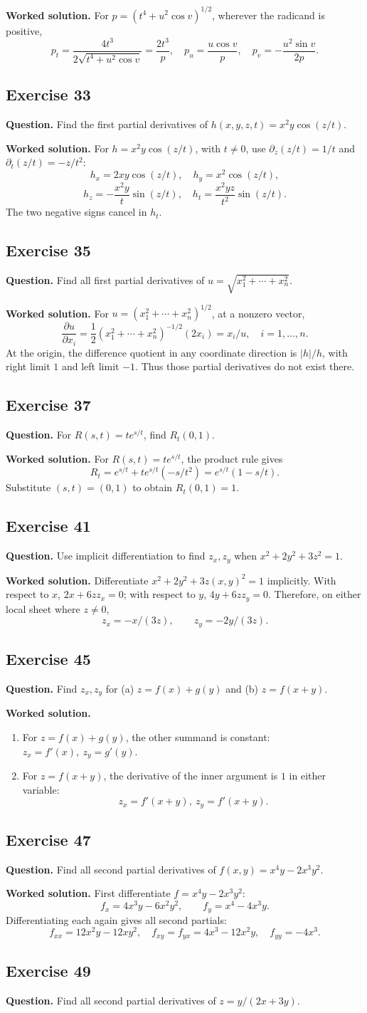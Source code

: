 \documentclass[11pt]{article}
\newcommand{\ex}[1]{\Needspace{8\baselineskip}\subsection*{Exercise #1}}
\newcommand{\ans}[1]{\boxed{#1}}
\begin{document}
\textbf{Worked solution.}
For $p=(t^4+u^2\cos v)^{1/2}$, wherever the radicand is positive,
\[p_t=\frac{4t^3}{2\sqrt{t^4+u^2\cos v}}=\ans{\frac{2t^3}{p}},\quad
\ans{p_u=\frac{u\cos v}{p}},\quad\ans{p_v=-\frac{u^2\sin v}{2p}}.\]
\ex{33}
\textbf{Question.} Find the first partial derivatives of $h(x,y,z,t)=x^2y\cos(z/t)$.

\textbf{Worked solution.}
For $h=x^2y\cos(z/t)$, with $t\ne0$, use $\partial_z(z/t)=1/t$ and $\partial_t(z/t)=-z/t^2$:
\[\ans{h_x=2xy\cos(z/t)},\quad\ans{h_y=x^2\cos(z/t)},\]
\[\ans{h_z=-\frac{x^2y}{t}\sin(z/t)},\quad\ans{h_t=\frac{x^2yz}{t^2}\sin(z/t)}.\]
The two negative signs cancel in $h_t$.
\ex{35}
\textbf{Question.} Find all first partial derivatives of $u=\sqrt{x_1^2+\cdots+x_n^2}$.

\textbf{Worked solution.}
For $u=(x_1^2+\cdots+x_n^2)^{1/2}$, at a nonzero vector,
\[\frac{\partial u}{\partial x_i}=\frac12(x_1^2+\cdots+x_n^2)^{-1/2}(2x_i)=\ans{x_i/u},\quad i=1,\ldots,n.\]
At the origin, the difference quotient in any coordinate direction is $|h|/h$, with right limit $1$ and left limit $-1$. Thus those partial derivatives do not exist there.
\ex{37}
\textbf{Question.} For $R(s,t)=te^{s/t}$, find $R_t(0,1)$.

\textbf{Worked solution.}
For $R(s,t)=te^{s/t}$, the product rule gives
\[R_t=e^{s/t}+te^{s/t}(-s/t^2)=e^{s/t}(1-s/t).\]
Substitute $(s,t)=(0,1)$ to obtain $\ans{R_t(0,1)=1}$.
\ex{41}
\textbf{Question.} Use implicit differentiation to find $z_x,z_y$ when $x^2+2y^2+3z^2=1$.

\textbf{Worked solution.}
Differentiate $x^2+2y^2+3z(x,y)^2=1$ implicitly. With respect to $x$, $2x+6zz_x=0$; with respect to $y$, $4y+6zz_y=0$. Therefore, on either local sheet where $z\ne0$,
\[\ans{z_x=-x/(3z)},\qquad\ans{z_y=-2y/(3z)}.\]
\ex{45}
\textbf{Question.} Find $z_x,z_y$ for (a) $z=f(x)+g(y)$ and (b) $z=f(x+y)$.

\textbf{Worked solution.}
\begin{enumerate}[label=(\alph*)]
\item For $z=f(x)+g(y)$, the other summand is constant: $\ans{z_x=f'(x),\ z_y=g'(y)}$.
\item For $z=f(x+y)$, the derivative of the inner argument is $1$ in either variable:
\[\ans{z_x=f'(x+y),\ z_y=f'(x+y)}.\]
\end{enumerate}
\ex{47}
\textbf{Question.} Find all second partial derivatives of $f(x,y)=x^4y-2x^3y^2$.

\textbf{Worked solution.}
First differentiate $f=x^4y-2x^3y^2$:
\[f_x=4x^3y-6x^2y^2,\qquad f_y=x^4-4x^3y.\]
Differentiating each again gives all second partials:
\[\ans{f_{xx}=12x^2y-12xy^2},\quad\ans{f_{xy}=f_{yx}=4x^3-12x^2y},\quad\ans{f_{yy}=-4x^3}.\]
\ex{49}
\textbf{Question.} Find all second partial derivatives of $z=y/(2x+3y)$.
\end{document}
